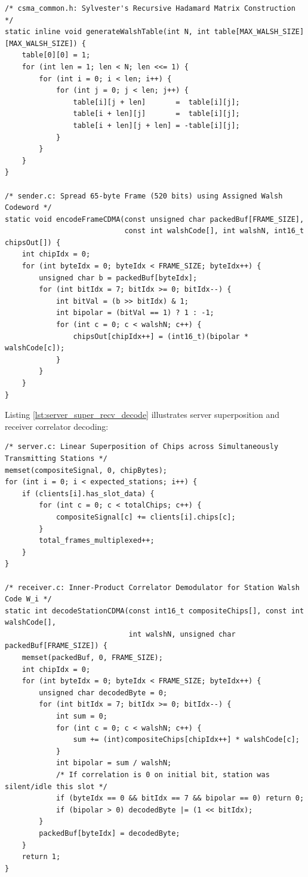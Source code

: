 \documentclass[11pt,a4paper]{article}
\begin{document}
\begin{lstlisting}[style=cstyle, caption={Sylvester's recursive construction and DSSS chip spreading.}, label={lst:walsh_encode}]
/* csma_common.h: Sylvester's Recursive Hadamard Matrix Construction */
static inline void generateWalshTable(int N, int table[MAX_WALSH_SIZE][MAX_WALSH_SIZE]) {
    table[0][0] = 1;
    for (int len = 1; len < N; len <<= 1) {
        for (int i = 0; i < len; i++) {
            for (int j = 0; j < len; j++) {
                table[i][j + len]       =  table[i][j];
                table[i + len][j]       =  table[i][j];
                table[i + len][j + len] = -table[i][j];
            }
        }
    }
}

/* sender.c: Spread 65-byte Frame (520 bits) using Assigned Walsh Codeword */
static void encodeFrameCDMA(const unsigned char packedBuf[FRAME_SIZE],
                            const int walshCode[], int walshN, int16_t chipsOut[]) {
    int chipIdx = 0;
    for (int byteIdx = 0; byteIdx < FRAME_SIZE; byteIdx++) {
        unsigned char b = packedBuf[byteIdx];
        for (int bitIdx = 7; bitIdx >= 0; bitIdx--) {
            int bitVal = (b >> bitIdx) & 1;
            int bipolar = (bitVal == 1) ? 1 : -1;
            for (int c = 0; c < walshN; c++) {
                chipsOut[chipIdx++] = (int16_t)(bipolar * walshCode[c]);
            }
        }
    }
}
\end{lstlisting}

Listing \ref{lst:server_super_recv_decode} illustrates server superposition and receiver correlator decoding:

\begin{lstlisting}[style=cstyle, caption={Channel linear superposition and receiver inner-product correlation.}, label={lst:server_super_recv_decode}]
/* server.c: Linear Superposition of Chips across Simultaneously Transmitting Stations */
memset(compositeSignal, 0, chipBytes);
for (int i = 0; i < expected_stations; i++) {
    if (clients[i].has_slot_data) {
        for (int c = 0; c < totalChips; c++) {
            compositeSignal[c] += clients[i].chips[c];
        }
        total_frames_multiplexed++;
    }
}

/* receiver.c: Inner-Product Correlator Demodulator for Station Walsh Code W_i */
static int decodeStationCDMA(const int16_t compositeChips[], const int walshCode[],
                             int walshN, unsigned char packedBuf[FRAME_SIZE]) {
    memset(packedBuf, 0, FRAME_SIZE);
    int chipIdx = 0;
    for (int byteIdx = 0; byteIdx < FRAME_SIZE; byteIdx++) {
        unsigned char decodedByte = 0;
        for (int bitIdx = 7; bitIdx >= 0; bitIdx--) {
            int sum = 0;
            for (int c = 0; c < walshN; c++) {
                sum += (int)compositeChips[chipIdx++] * walshCode[c];
            }
            int bipolar = sum / walshN;
            /* If correlation is 0 on initial bit, station was silent/idle this slot */
            if (byteIdx == 0 && bitIdx == 7 && bipolar == 0) return 0;
            if (bipolar > 0) decodedByte |= (1 << bitIdx);
        }
        packedBuf[byteIdx] = decodedByte;
    }
    return 1;
}
\end{lstlisting}
\end{document}
